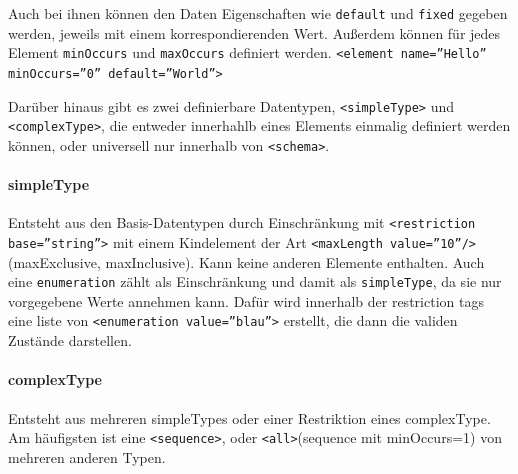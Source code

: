 \documentclass[12pt,a4]{article}
\begin{document}
	Auch bei ihnen können den Daten Eigenschaften wie \texttt{default} und \texttt{fixed} gegeben werden, jeweils mit einem korrespondierenden Wert. Außerdem können für jedes Element \texttt{minOccurs} und \texttt{maxOccurs} definiert werden. \texttt{<element name=''Hello'' minOccurs=''0'' default=''World''>}
	
	Darüber hinaus gibt es zwei definierbare Datentypen, \texttt{<simpleType>} und \texttt{<complexType>}, die entweder innerhahlb eines Elements einmalig definiert werden können, oder universell nur innerhalb von \texttt{<schema>}.
	\paragraph{simpleType}
	Entsteht aus den Basis-Datentypen durch Einschränkung mit \texttt{<restriction base=''string''>} mit einem Kindelement der Art \texttt{<maxLength value=''10''/>} (maxExclusive, maxInclusive). Kann keine anderen Elemente enthalten.
	Auch eine \texttt{enumeration} zählt als Einschränkung und damit als \texttt{simpleType}, da sie nur vorgegebene Werte annehmen kann. Dafür wird innerhalb der restriction tags eine liste von \texttt{<enumeration value=''blau''>} erstellt, die dann die validen Zustände darstellen.
	\paragraph{complexType}
	Entsteht aus mehreren simpleTypes oder einer Restriktion eines complexType. Am häufigsten ist eine \texttt{<sequence>}, oder \texttt{<all>}(sequence mit minOccurs=1) von mehreren anderen Typen.
	
	
	
	
	
	
	
	
\end{document}

